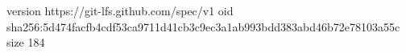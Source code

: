 version https://git-lfs.github.com/spec/v1
oid sha256:5d474facfb4cdf53ca9711d41cb3c9ec3a1ab993bdd383abd46b72e78103a55c
size 184
